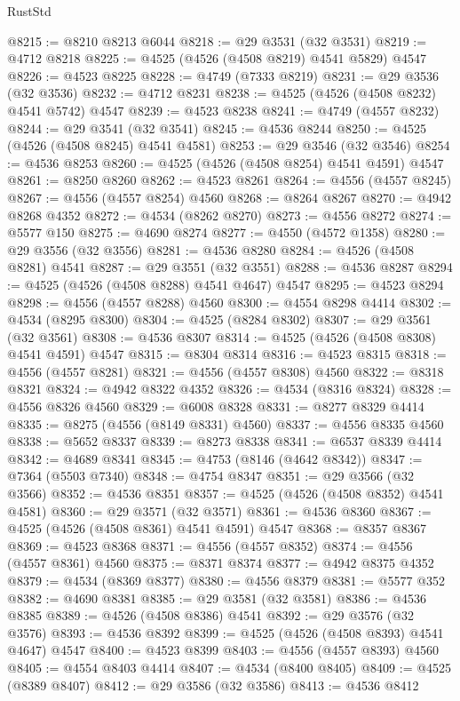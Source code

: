 \begin{lexlean}{RustStd}
\begin{coremodule}
@8215 := @8210 @8213 @6044
@8218 := @29 @3531 (@32 @3531)
@8219 := @4712 @8218
@8225 := @4525 (@4526 (@4508 @8219) @4541 @5829) @4547
@8226 := @4523 @8225
@8228 := @4749 (@7333 @8219)
@8231 := @29 @3536 (@32 @3536)
@8232 := @4712 @8231
@8238 := @4525 (@4526 (@4508 @8232) @4541 @5742) @4547
@8239 := @4523 @8238
@8241 := @4749 (@4557 @8232)
@8244 := @29 @3541 (@32 @3541)
@8245 := @4536 @8244
@8250 := @4525 (@4526 (@4508 @8245) @4541 @4581)
@8253 := @29 @3546 (@32 @3546)
@8254 := @4536 @8253
@8260 := @4525 (@4526 (@4508 @8254) @4541 @4591) @4547
@8261 := @8250 @8260
@8262 := @4523 @8261
@8264 := @4556 (@4557 @8245)
@8267 := @4556 (@4557 @8254) @4560
@8268 := @8264 @8267
@8270 := @4942 @8268 @4352
@8272 := @4534 (@8262 @8270)
@8273 := @4556 @8272
@8274 := @5577 @150
@8275 := @4690 @8274
@8277 := @4550 (@4572 @1358)
@8280 := @29 @3556 (@32 @3556)
@8281 := @4536 @8280
@8284 := @4526 (@4508 @8281) @4541
@8287 := @29 @3551 (@32 @3551)
@8288 := @4536 @8287
@8294 := @4525 (@4526 (@4508 @8288) @4541 @4647) @4547
@8295 := @4523 @8294
@8298 := @4556 (@4557 @8288) @4560
@8300 := @4554 @8298 @4414
@8302 := @4534 (@8295 @8300)
@8304 := @4525 (@8284 @8302)
@8307 := @29 @3561 (@32 @3561)
@8308 := @4536 @8307
@8314 := @4525 (@4526 (@4508 @8308) @4541 @4591) @4547
@8315 := @8304 @8314
@8316 := @4523 @8315
@8318 := @4556 (@4557 @8281)
@8321 := @4556 (@4557 @8308) @4560
@8322 := @8318 @8321
@8324 := @4942 @8322 @4352
@8326 := @4534 (@8316 @8324)
@8328 := @4556 @8326 @4560
@8329 := @6008 @8328
@8331 := @8277 @8329 @4414
@8335 := @8275 (@4556 (@8149 @8331) @4560)
@8337 := @4556 @8335 @4560
@8338 := @5652 @8337
@8339 := @8273 @8338
@8341 := @6537 @8339 @4414
@8342 := @4689 @8341
@8345 := @4753 (@8146 (@4642 @8342))
@8347 := @7364 (@5503 @7340)
@8348 := @4754 @8347
@8351 := @29 @3566 (@32 @3566)
@8352 := @4536 @8351
@8357 := @4525 (@4526 (@4508 @8352) @4541 @4581)
@8360 := @29 @3571 (@32 @3571)
@8361 := @4536 @8360
@8367 := @4525 (@4526 (@4508 @8361) @4541 @4591) @4547
@8368 := @8357 @8367
@8369 := @4523 @8368
@8371 := @4556 (@4557 @8352)
@8374 := @4556 (@4557 @8361) @4560
@8375 := @8371 @8374
@8377 := @4942 @8375 @4352
@8379 := @4534 (@8369 @8377)
@8380 := @4556 @8379
@8381 := @5577 @352
@8382 := @4690 @8381
@8385 := @29 @3581 (@32 @3581)
@8386 := @4536 @8385
@8389 := @4526 (@4508 @8386) @4541
@8392 := @29 @3576 (@32 @3576)
@8393 := @4536 @8392
@8399 := @4525 (@4526 (@4508 @8393) @4541 @4647) @4547
@8400 := @4523 @8399
@8403 := @4556 (@4557 @8393) @4560
@8405 := @4554 @8403 @4414
@8407 := @4534 (@8400 @8405)
@8409 := @4525 (@8389 @8407)
@8412 := @29 @3586 (@32 @3586)
@8413 := @4536 @8412

\end{coremodule}
\end{lexlean}
